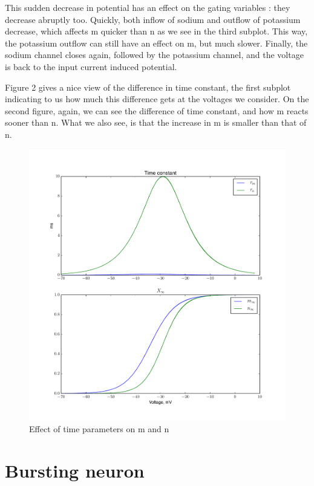 \documentclass[a4paper,11pt]{article} %
\begin{document}
This sudden decrease in potential has an effect on the gating variables
: they decrease abruptly too. Quickly, both inflow of sodium and
outflow of potassium decrease, which affects m quicker than n as
we see in the third subplot. This way, the potassium outflow can
still have an effect on m, but much slower. Finally, the sodium channel
closes again, followed by the potassium channel, and the voltage
is back to the input current induced potential.

Figure 2 gives a nice view of the difference in time constant,
the first subplot indicating to us how much this difference gets
at the voltages we consider. On the second figure, again, we can
see the difference of time constant, and how m reacts sooner than
n. What we also see, is that the increase in m is smaller than
that of n.

\begin{figure}[H]
    \centering
    \includegraphics[width=\textwidth]{tau_inf}
    \caption{Effect of time parameters on m and n}
    \label{fig:tau_inf}
\end{figure}

\section{Bursting neuron}
\end{document}
